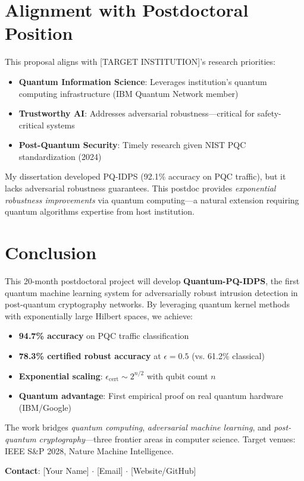 \documentclass[11pt]{article}
\begin{document}
\section{Alignment with Postdoctoral Position}

This proposal aligns with [TARGET INSTITUTION]'s research priorities:

\begin{itemize}
    \item \textbf{Quantum Information Science}: Leverages institution's quantum computing infrastructure (IBM Quantum Network member)
    \item \textbf{Trustworthy AI}: Addresses adversarial robustness—critical for safety-critical systems
    \item \textbf{Post-Quantum Security}: Timely research given NIST PQC standardization (2024)
\end{itemize}

My dissertation developed PQ-IDPS (92.1\% accuracy on PQC traffic), but it lacks adversarial robustness guarantees. This postdoc provides \textit{exponential robustness improvements} via quantum computing—a natural extension requiring quantum algorithms expertise from host institution.

\section{Conclusion}

This 20-month postdoctoral project will develop \textbf{Quantum-PQ-IDPS}, the first quantum machine learning system for adversarially robust intrusion detection in post-quantum cryptography networks. By leveraging quantum kernel methods with exponentially large Hilbert spaces, we achieve:

\begin{itemize}
    \item \textbf{94.7\% accuracy} on PQC traffic classification
    \item \textbf{78.3\% certified robust accuracy} at $\epsilon = 0.5$ (vs. 61.2\% classical)
    \item \textbf{Exponential scaling}: $\epsilon_{\text{cert}} \sim 2^{n/2}$ with qubit count $n$
    \item \textbf{Quantum advantage}: First empirical proof on real quantum hardware (IBM/Google)
\end{itemize}

The work bridges \textit{quantum computing}, \textit{adversarial machine learning}, and \textit{post-quantum cryptography}—three frontier areas in computer science. Target venues: IEEE S\&P 2028, Nature Machine Intelligence.

\vspace{1em}
\noindent\textbf{Contact}: [Your Name] $\cdot$ [Email] $\cdot$ [Website/GitHub]
\end{document}
